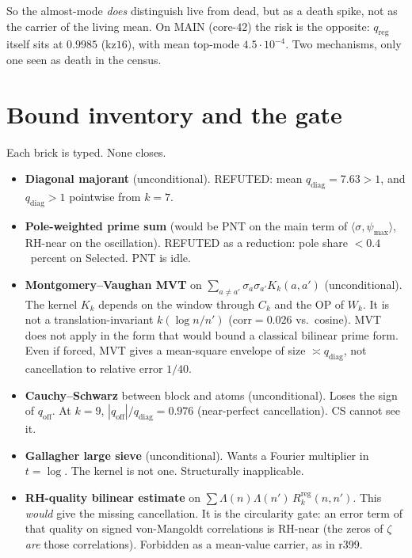 \documentclass[11pt]{article}
\theoremstyle{remark}
\begin{document}
So the almost-mode \emph{does} distinguish live from dead,
but as a death spike, not as the carrier of the living
mean.  On MAIN (core-$42$) the risk is the opposite:
$q_{\mathrm{reg}}$ itself sits at $0.9985$ (kz$16$), with
mean top-mode $4.5\cdot 10^{-4}$.  Two mechanisms, only
one seen as death in the census.

\section{Bound inventory and the gate}\label{sec:bound}

Each brick is typed.  None closes.

\begin{itemize}
\item \textbf{Diagonal majorant} (unconditional).
REFUTED: mean $q_{\mathrm{diag}}=7.63>1$, and
$q_{\mathrm{diag}}>1$ pointwise from $k=7$.
\item \textbf{Pole-weighted prime sum} (would be PNT on
the main term of $\langle\sigma,\psi_{\max}\rangle$,
RH-near on the oscillation).
REFUTED as a reduction: pole share $<0.4$~percent on
Selected.  PNT is idle.
\item \textbf{Montgomery--Vaughan MVT} on
$\sum_{a\neq a'}\sigma_a\sigma_{a'}K_k(a,a')$
(unconditional).
The kernel $K_k$ depends on the window through $C_k$ and
the OP of $W_k$.  It is not a translation-invariant
$k(\log n/n')$ ($\mathrm{corr}=0.026$ vs.\ cosine).
MVT does not apply in the form that would bound a
classical bilinear prime form.  Even if forced, MVT
gives a mean-square envelope of size $\asymp q_{\mathrm{diag}}$,
not cancellation to relative error $1/40$.
\item \textbf{Cauchy--Schwarz} between block and atoms
(unconditional).
Loses the sign of $q_{\mathrm{off}}$.  At $k=9$,
$|q_{\mathrm{off}}|/q_{\mathrm{diag}}=0.976$
(near-perfect cancellation).  CS cannot see it.
\item \textbf{Gallagher large sieve} (unconditional).
Wants a Fourier multiplier in $t=\log$.  The kernel is
not one.  Structurally inapplicable.
\item \textbf{RH-quality bilinear estimate} on
$\sum\Lambda(n)\Lambda(n')\,R^{\mathrm{reg}}_k(n,n')$.
This \emph{would} give the missing cancellation.
It is the circularity gate: an error term of that
quality on signed von-Mangoldt correlations is RH-near
(the zeros of $\zeta$ \emph{are} those correlations).
Forbidden as a mean-value carrier, as in r399.
\end{itemize}
\end{document}
